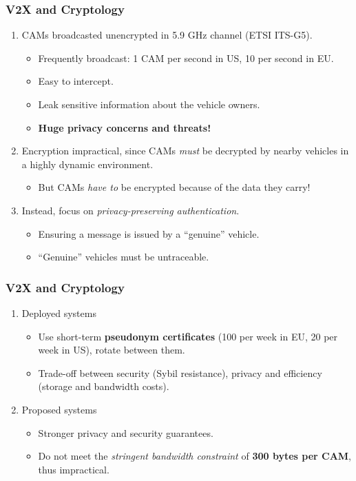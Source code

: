 \documentclass{beamer}
\begin{document}
    \begin{frame}
        \frametitle{V2X and Cryptology}
        \begin{enumerate}
            \item<1-> CAMs broadcasted unencrypted in 5.9 GHz channel (ETSI ITS-G5).
            \begin{itemize}
                \item<2-> Frequently broadcast: 1 CAM per second in US, 10 per
                second in EU.
                \item<2-> Easy to intercept.
                \item<2-> Leak sensitive information about the vehicle owners.
                \item<3-> \textbf{Huge privacy concerns and threats!}
            \end{itemize}
            \item<4-> Encryption impractical, since CAMs \emph{must} be decrypted by
            nearby vehicles in a highly dynamic environment.
            \begin{itemize}
                \item But CAMs \emph{have to} be encrypted because of the data
                they carry!
            \end{itemize}
            \item<5-> Instead, focus on \emph{privacy-preserving authentication}.
            \begin{itemize}
                \item Ensuring a message is issued by a ``genuine'' vehicle.
                \item ``Genuine'' vehicles must be untraceable.
            \end{itemize}
        \end{enumerate}
    \end{frame}

    \begin{frame}
        \frametitle{V2X and Cryptology}
        \begin{enumerate}
            \item<1-> Deployed systems
            \begin{itemize}
                \item Use short-term \textbf{pseudonym certificates} (100 per
                week in EU, 20 per week in US), rotate between them.
                \item Trade-off between security (Sybil resistance), privacy and
                efficiency (storage and bandwidth costs).
            \end{itemize}
            \item<2-> Proposed systems
            \begin{itemize}
                \item Stronger privacy and security guarantees.
                \item Do not meet the \emph{stringent bandwidth constraint} of
                \textbf{300 bytes per CAM}, thus impractical.
            \end{itemize}
        \end{enumerate}
    \end{frame}
\end{document}
